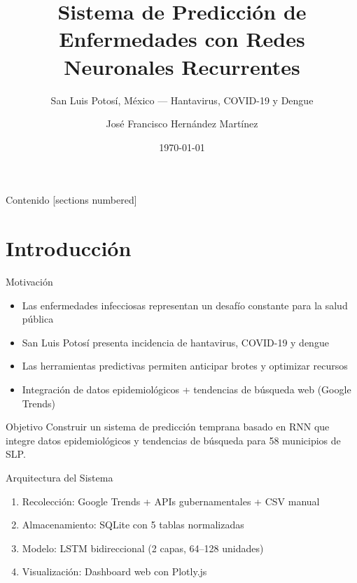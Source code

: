 \documentclass[10pt]{beamer}
\title{Sistema de Predicción de Enfermedades con Redes Neuronales Recurrentes}
\subtitle{San Luis Potosí, México — Hantavirus, COVID-19 y Dengue}
\date{\today}
\author{José Francisco Hernández Martínez}
\institute{IICO — Universidad Autónoma de San Luis Potosí}
\begin{document}
\maketitle

\begin{frame}{Contenido}
  [sections numbered]
  \tableofcontents[hideallsubsections]
\end{frame}

\section{Introducción}

\begin{frame}{Motivación}
  \begin{itemize}
    \item Las enfermedades infecciosas representan un desafío constante para la salud pública
    \item San Luis Potosí presenta incidencia de hantavirus, COVID-19 y dengue
    \item Las herramientas predictivas permiten anticipar brotes y optimizar recursos
    \item Integración de datos epidemiológicos + tendencias de búsqueda web (Google Trends)
  \end{itemize}
  \vspace{0.5cm}
  \begin{alertblock}{Objetivo}
    Construir un sistema de predicción temprana basado en RNN que integre
    datos epidemiológicos y tendencias de búsqueda para 58 municipios de SLP.
  \end{alertblock}
\end{frame}

\begin{frame}{Arquitectura del Sistema}
  \centering
  
  \begin{enumerate}
    \item Recolección: Google Trends + APIs gubernamentales + CSV manual
    \item Almacenamiento: SQLite con 5 tablas normalizadas
    \item Modelo: LSTM bidireccional (2 capas, 64--128 unidades)
    \item Visualización: Dashboard web con Plotly.js
  \end{enumerate}
\end{frame}
\end{document}
